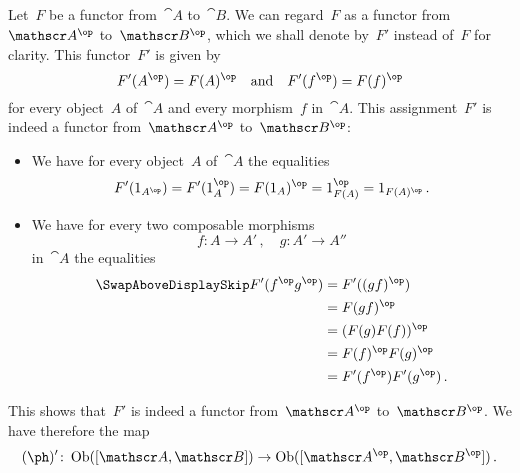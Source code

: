 \subsection{}

Let~$F$ be a functor from~$\cat{A}$ to~$\cat{B}$.
We can regard~$F$ as a functor from~$\cat{A}^{\op}$ to~$\cat{B}^{\op}$, which we shall denote by~$F'$ instead of~$F$ for clarity.
This functor~$F'$ is given by
\[
	F'( A^{\op} ) = F(A)^{\op}
	\quad\text{and}\quad
	F'( f^{\op} ) = F(f)^{\op}
\]
for every object~$A$ of~$\cat{A}$ and every morphism~$f$ in~$\cat{A}$.
This assignment~$F'$ is indeed a functor from~$\cat{A}^{\op}$ to~$\cat{B}^{\op}$:
\begin{itemize}

	\item
		We have for every object~$A$ of~$\cat{A}$ the equalities
		\[
			F'( \id_{A^{\op}} )
			=
			F'( \id_A^{\op} )
			=
			F(\id_A)^{\op}
			=
			\id_{F(A)}^{\op}
			=
			\id_{F(A)^{\op}} \,.
		\]

	\item
		We have for every two composable morphisms
		\[
			f \colon A \to A' \,,
			\quad
			g \colon A' \to A''
		\]
		in~$\cat{A}$ the equalities
		\begin{align*}
			\SwapAboveDisplaySkip
			F'( f^{\op} g^{\op} )
			&=
			F'( (gf)^{\op} )
			\\
			&=
			F(gf)^{\op}
			\\
			&=
			( F(g) F(f) )^{\op}
			\\
			&=
			F(f)^{\op} F(g)^{\op}
			\\
			&=
			F'(f^{\op}) F'(g^{\op}) \,.
		\end{align*}

\end{itemize}
This shows that~$F'$ is indeed a functor from~$\cat{A}^{\op}$ to~$\cat{B}^{\op}$.
We have therefore the map
\begin{equation}
	\label{opposite_on_objects}
	(\ph)'
	\colon
	\Ob([\cat{A}, \cat{B}])
	\to
	\Ob([\cat{A}^{\op}, \cat{B}^{\op}]) \,.
\end{equation}

